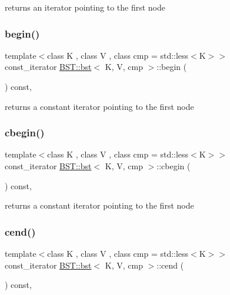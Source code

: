 returns an iterator pointing to the first node \mbox{\label{classBST_1_1bst_a09b9837132cc0a911be4409bab8ab56f}} 
\subsubsection{\texorpdfstring{begin()}{begin()}\hspace{0.1cm}{\footnotesize\ttfamily [2/2]}}
{\footnotesize\ttfamily template$<$class K , class V , class cmp  = std\+::less$<$\+K$>$$>$ \\
const\+\_\+iterator \hyperlink{classBST_1_1bst}{B\+S\+T\+::bst}$<$ K, V, cmp $>$\+::begin (\begin{DoxyParamCaption}{ }\end{DoxyParamCaption}) const\hspace{0.3cm}{\ttfamily [inline]}, {\ttfamily [noexcept]}}

returns a constant iterator pointing to the first node \mbox{\label{classBST_1_1bst_aeb386c648e83761a52fe4ff1ac493463}} 
\subsubsection{\texorpdfstring{cbegin()}{cbegin()}}
{\footnotesize\ttfamily template$<$class K , class V , class cmp  = std\+::less$<$\+K$>$$>$ \\
const\+\_\+iterator \hyperlink{classBST_1_1bst}{B\+S\+T\+::bst}$<$ K, V, cmp $>$\+::cbegin (\begin{DoxyParamCaption}{ }\end{DoxyParamCaption}) const\hspace{0.3cm}{\ttfamily [inline]}, {\ttfamily [noexcept]}}

returns a constant iterator pointing to the first node \mbox{\label{classBST_1_1bst_a17559d18bdbc5db5b77537a7044e449d}} 
\subsubsection{\texorpdfstring{cend()}{cend()}}
{\footnotesize\ttfamily template$<$class K , class V , class cmp  = std\+::less$<$\+K$>$$>$ \\
const\+\_\+iterator \hyperlink{classBST_1_1bst}{B\+S\+T\+::bst}$<$ K, V, cmp $>$\+::cend (\begin{DoxyParamCaption}{ }\end{DoxyParamCaption}) const\hspace{0.3cm}{\ttfamily [inline]}, {\ttfamily [noexcept]}}

